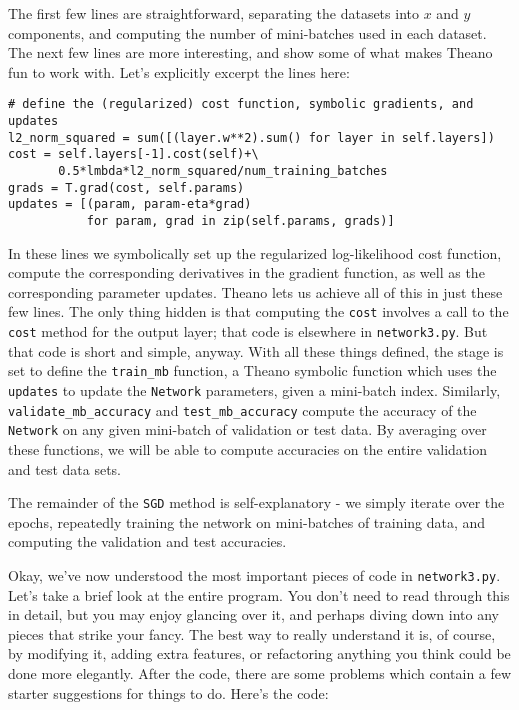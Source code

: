 The first few lines are straightforward, separating the datasets into $x$ and $y$ components, and computing the number of mini-batches used in each dataset. The next few lines are more interesting, and show some of what makes Theano fun to work with. Let's explicitly excerpt the lines here:

\begin{lstlisting}
# define the (regularized) cost function, symbolic gradients, and updates
l2_norm_squared = sum([(layer.w**2).sum() for layer in self.layers])
cost = self.layers[-1].cost(self)+\
       0.5*lmbda*l2_norm_squared/num_training_batches
grads = T.grad(cost, self.params)
updates = [(param, param-eta*grad) 
           for param, grad in zip(self.params, grads)]
\end{lstlisting}

In these lines we symbolically set up the regularized log-likelihood cost function, compute the corresponding derivatives in the gradient function, as well as the corresponding parameter updates. Theano lets us achieve all of this in just these few lines. The only thing hidden is that computing the \lstinline{cost} involves a call to the \lstinline{cost} method for the output layer; that code is elsewhere in \lstinline{network3.py}. But that code is short and simple, anyway. With all these things defined, the stage is set to define the \lstinline{train_mb} function, a Theano symbolic function which uses the \lstinline{updates} to update the \lstinline{Network} parameters, given a mini-batch index. Similarly, \lstinline{validate_mb_accuracy} and \lstinline{test_mb_accuracy} compute the accuracy of the \lstinline{Network} on any given mini-batch of validation or test data. By averaging over these functions, we will be able to compute accuracies on the entire validation and test data sets.

The remainder of the \lstinline{SGD} method is self-explanatory - we simply iterate over the epochs, repeatedly training the network on mini-batches of training data, and computing the validation and test accuracies. 

Okay, we've now understood the most important pieces of code in \lstinline{network3.py}. Let's take a brief look at the entire program. You don't need to read through this in detail, but you may enjoy glancing over it, and perhaps diving down into any pieces that strike your fancy. The best way to really understand it is, of course, by modifying it, adding extra features, or refactoring anything you think could be done more elegantly. After the code, there are some problems which contain a few starter suggestions for things to do. Here's the code:

